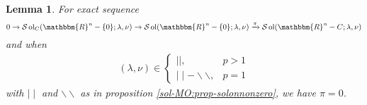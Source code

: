 \documentclass{article}
\newcommand{\tmop}[1]{\ensuremath{\operatorname{#1}}}
\newcommand{\um}{-}
\newtheorem{lemma}[proposition]{Lemma}
\theoremstyle{remark}
\begin{document}
\begin{lemma}
  \label{sol-MO:lem-zeromap}For exact sequence
  \[ 0 \rightarrow \mathcal{S} \tmop{ol}_C (\mathbbm{R}^n - \{ 0 \} ; \lambda,
     \nu) \rightarrow \mathcal{S} \tmop{ol} (\mathbbm{R}^n - \{ 0 \} ;
     \lambda, \nu) \xrightarrow{\pi} \mathcal{S} \tmop{ol} (\mathbbm{R}^n - C
     ; \lambda, \nu) \]
  and when
  \begin{eqnarray}
    & (\lambda, \nu) \in \left\{ \begin{array}{ll}
      \mid \mid, & p > 1\\
      \mid \mid \um \backslash\backslash, & p = 1
    \end{array} \right. &  \nonumber
  \end{eqnarray}
  with $\mid \mid$ and $\backslash\backslash$ as in proposition
  \ref{sol-MO:prop-solonnonzero}, we have $\pi = 0$.
\end{lemma}
\end{document}
